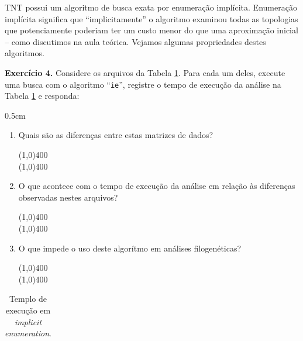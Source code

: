 \begin{refsection}
TNT possui um algoritmo de busca exata por enumeração implícita. Enumeração implícita significa que ``implicitamente'' o algoritmo examinou todas as topologias que potenciamente poderiam ter um custo menor do que uma aproximação inicial -- como discutimos na aula teórica. Vejamos algumas propriedades destes algoritmos.\\

\begin{blackBlock}{\textbf{Exercício 4.}}\label{tut4:ex:4.7}
	Considere os arquivos da Tabela \ref{tut4:table:ie}. Para cada um deles, execute uma busca com o algoritmo ``\texttt{ie}'', registre o tempo de execução da análise na Tabela \ref{tut4:table:ie} e responda: 

\begin {myindentpar}{0.5cm}
\begin{enumerate}[\itshape a.]
	\item{Quais são as diferenças entre estas matrizes de dados?}
\begin{center}
\line(1,0){400}\\
\line(1,0){400}\\
\end{center}

	\item{O que acontece com o tempo de execução da análise em relação às diferenças observadas nestes arquivos?}
\begin{center}
\line(1,0){400}\\
\line(1,0){400}\\
\end{center}

	\item{O que impede o uso deste algorítmo em análises filogenéticas?}
\begin{center}
\line(1,0){400}\\
\line(1,0){400}\\
\end{center}

\end{enumerate}
\end{myindentpar}

\end{blackBlock}

\pagestyle{fancy}
\begin{center}

\begin{longtable}{lcccccc}
\caption[Tabela \ref{tut4:table:ie}: Templo de execução em \textit{implicit enumeration}]{Templo de execução em \textit{implicit enumeration}.} \label{tut4:table:ie} \\



\end{longtable}
\end{center}
\end{refsection}
